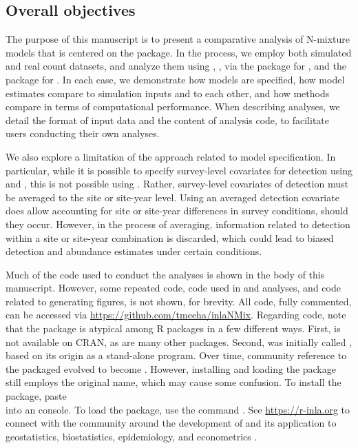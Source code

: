 \documentclass[codesnippet]{jss}
\begin{document}
\subsection[Overall objectives]{Overall objectives}
The purpose of this manuscript is to present a comparative analysis of N-mixture models that is centered on the  package. In the process, we employ both simulated and real count datasets, and analyze them using , , via the  package \citep{Denwood_2016} for , and the  package for . In each case, we demonstrate how models are specified, how model estimates compare to simulation inputs and to each other, and how methods compare in terms of computational performance. When describing  analyses, we detail the format of input data and the content of analysis code, to facilitate users conducting their own analyses.

We also explore a limitation of the  approach related to model specification. In particular, while it is possible to specify survey-level covariates for detection using  and , this is not possible using . Rather, survey-level covariates of detection must be averaged to the site or site-year level. Using an averaged detection covariate does allow accounting for site or site-year differences in survey conditions, should they occur. However, in the process of averaging, information related to detection within a site or site-year combination is discarded, which could lead to biased detection and abundance estimates under certain conditions.

Much of the code used to conduct the  analyses is shown in the body of this manuscript. However, some repeated  code, code used in  and  analyses, and code related to generating figures, is not shown, for brevity. All code, fully commented, can be accessed via \url{https://github.com/tmeeha/inlaNMix}. Regarding code, note that the  package is atypical among R packages in a few different ways.  First,  is not available on CRAN, as are many other  packages. Second,  was initially called , based on its origin as a stand-alone  program.  Over time, community reference to the packaged evolved to become .  However, installing and loading the package still employs the original name, which may cause some confusion. To install the package, paste  \\into an  console. To load the package, use the  command . See \url{https://r-inla.org} to connect with the community around the development of  and its application to geostatistics, biostatistics, epidemiology, and econometrics \citep{Lindgren_Rue_2015,Blangiardo_Cameletti_2015}.
\end{document}
